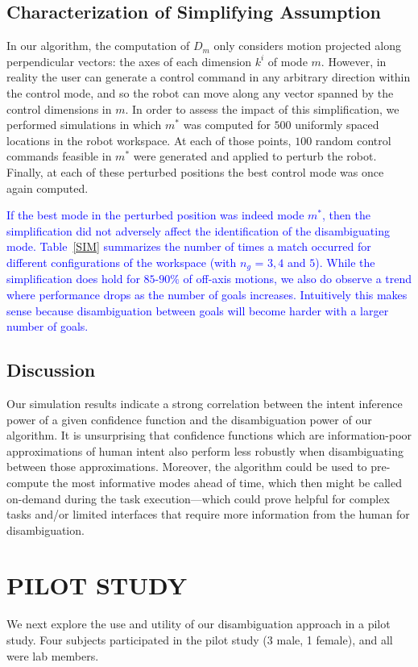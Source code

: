 \documentclass[conference]{IEEEtran}
\begin{document}
\subsection{Characterization of Simplifying Assumption}
In our algorithm, the computation of $D_{m}$ only considers motion projected along perpendicular vectors: the axes of each dimension $k^i$ of mode $m$. However, in reality the user can generate a control command in any arbitrary direction within the control mode, and so the robot can move along any vector spanned by the control dimensions in $m$. In order to assess the impact of this simplification, we performed simulations in which $m^*$ was computed for $500$ uniformly spaced locations in the robot workspace. At each of those points, $100$ random control commands feasible in $m^*$ were generated and applied to perturb the robot. Finally, at each of these perturbed positions the best control mode was once again computed. 

\textcolor{blue}{If the best mode in the perturbed position was indeed mode $m^*$, then the simplification did not adversely affect the identification of the disambiguating mode. Table~\ref{SIM} summarizes the number of times a match occurred for different configurations of the workspace (with $n_g$ = $3,4$ and $5$). While the simplification does hold for $85$-$90\%$ of off-axis motions, we also do observe a trend where performance drops as the number of goals increases. Intuitively this makes sense because disambiguation between goals will become harder with a larger number of goals.}
 
 \subsection{Discussion}
Our simulation results indicate a strong correlation between the intent inference power of a given confidence function and the disambiguation power of our algorithm. It is unsurprising that confidence functions which are information-poor approximations of human intent also perform less robustly when disambiguating between those approximations.
 Moreover, the algorithm could be used to pre-compute the most informative modes ahead of time, which then might be called on-demand during the task execution---which could prove helpful for complex tasks and/or limited interfaces that require more information from the human for disambiguation. 
 \section{PILOT STUDY} \label{EXP}
 We next explore the use and utility of our disambiguation approach in a pilot study. Four subjects participated in the pilot study (3 male, 1 female), and all were lab members.
\end{document}
